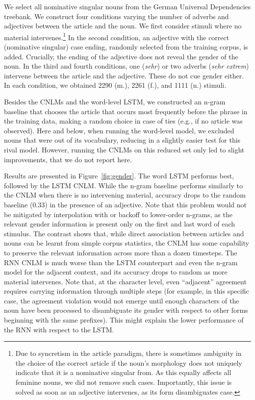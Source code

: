 We select all nominative singular nouns from the German Universal Dependencies treebank. %
We construct four conditions varying the number of adverbs and adjectives between the article and the noun.
We first consider stimuli where no material intervenes.\footnote{Due to syncretism in the article paradigm, there is sometimes ambiguity in the choice of the correct article if the noun's morphology does not uniquely indicate that it is a nominative singular from. As this equally affects all feminine nouns, we did not remove such cases. Importantly, this issue is solved as soon as an adjective intervenes, as its form disambiguates case.}
In the second condition, an adjective with the correct (nominative singular) case ending, randomly selected from the training corpus, is added.
Crucially, the ending of the adjective does not reveal the gender of the noun.
In the third and fourth conditions, one (\emph{sehr}) or two adverbs (\emph{sehr extrem}) intervene between the article and the adjective.
These do not cue gender either.
In each condition, we obtained 2290 (m.), 2261 (f.), and 1111 (n.) stimuli.

Besides the CNLMs and the word-level LSTM, we constructed an n-gram baseline that chooses the article that occurs most frequently before the phrase in the training data, making a random choice in case of ties (e.g., if no article was observed). Here and below, when running the word-level model, we excluded nouns that were out of its vocabulary, reducing in a slightly easier test for this rival model. However, running the CNLMs on this reduced set only led to slight improvements, that we do not report here. 

Results are presented in Figure~\ref{fig:gender}. The word LSTM  performs best, followed by the LSTM CNLM.
While the n-gram baseline performs similarly to the CNLM when there is no intervening material, accuracy drops to the random baseline (0.33) in the presence of an adjective.
Note that this problem would not be mitigated by interpolation with or backoff to lower-order n-grams, as the relevant gender information is present only on the first and last word of each stimulus. The contrast shows that, while direct association between articles and nouns can be learnt from simple corpus statistics, the CNLM has some capability to preserve the relevant information across more than a dozen timesteps. The RNN CNLM is much worse than the LSTM counterpart and even the n-gram model for the adjacent context, and its accuracy drops to random as more material intervenes. Note that, at the character level, even ``adjacent'' agreement requires carrying information through multiple steps (for example, in this specific case, the agreement violation would not emerge until enough characters of the noun have been processed to disambiguate its gender with respect to other forms beginning with the same prefixes). This might explain the lower performance of the RNN with respect to the LSTM.

